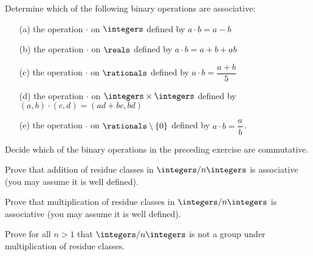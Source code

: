 \begin{exercise}
	Determine which of the following binary operations are 
	associative: 
	\begin{enumerate}
		\item[(a)] the operation $\cdot$ on $\integers$ defined by 
		$a \cdot b = a - b$
		
		\item[(b)] the operation $\cdot$ on $\reals$ defined by $a 
		\cdot b = a + b + ab$
		
		\item[(c)] the operation $\cdot$ on $\rationals$ defined by 
		$a \cdot b = \dfrac{a+b}{5}$
		
		\item[(d)] the operation $\cdot$ on $\integers \times 
		\integers$ defined by $(a,b) \cdot (c,d) = (ad + bc, bd)$
		
		\item[(e)] the operation $\cdot$ on $\rationals \setminus 
		\{ 0 \}$ defined by $a \cdot b = \dfrac{a}{b}$\,.
	\end{enumerate}
\end{exercise}


\begin{exercise}
	Decide which of the binary operations in the preceding exercise 
	are commutative.
\end{exercise}


\begin{exercise}
	Prove that addition of residue classes in 
	$\integers/n\integers$ is associative (you may assume it is 
	well defined).
\end{exercise}


\begin{exercise}
	Prove that multiplication of residue classes in 
	$\integers/n\integers$ is associative (you may assume it is 
	well defined).
\end{exercise}


\begin{exercise}
	Prove for all $n > 1$ that $\integers/n\integers$ is not a 
	group under multiplication of residue classes.
\end{exercise}

